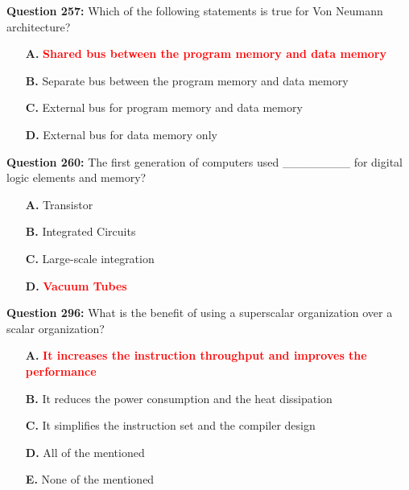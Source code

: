 \documentclass[12pt,a4paper]{article}
\begin{document}
\vspace{0.5cm}

\textbf{Question 257:} Which of the following statements is true for Von Neumann architecture?

\begin{itemize}
    \item[\textbf{A.}] \textcolor{red}{\textbf{Shared bus between the program memory and data memory}}
    \item[\textbf{B.}] Separate bus between the program memory and data memory
    \item[\textbf{C.}] External bus for program memory and data memory
    \item[\textbf{D.}] External bus for data memory only
\end{itemize}

\vspace{0.5cm}

\textbf{Question 260:} The first generation of computers used ________ for digital logic elements and memory?

\begin{itemize}
    \item[\textbf{A.}] Transistor
    \item[\textbf{B.}] Integrated Circuits
    \item[\textbf{C.}] Large-scale integration
    \item[\textbf{D.}] \textcolor{red}{\textbf{Vacuum Tubes}}
\end{itemize}

\vspace{0.5cm}

\textbf{Question 296:} What is the benefit of using a superscalar organization over a scalar organization?

\begin{itemize}
    \item[\textbf{A.}] \textcolor{red}{\textbf{It increases the instruction throughput and improves the performance}}
    \item[\textbf{B.}] It reduces the power consumption and the heat dissipation
    \item[\textbf{C.}] It simplifies the instruction set and the compiler design
    \item[\textbf{D.}] All of the mentioned
    \item[\textbf{E.}] None of the mentioned
\end{itemize}

\vspace{0.5cm}
\end{document}
